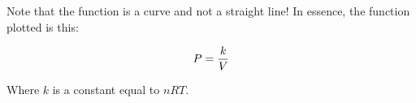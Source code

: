 Note that the function is a curve and not a straight line!  In essence, the function plotted is this:

$$P = {k \over V}$$

Where $k$ is a constant equal to $nRT$.
 









